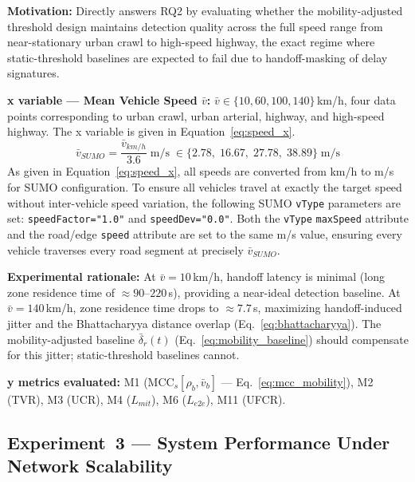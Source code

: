 \documentclass[12pt, a4paper]{report}
\begin{document}
{{\textbf{Motivation:} Directly answers RQ2 by
evaluating whether the mobility-adjusted threshold
design maintains detection quality across the full
speed range from near-stationary urban crawl to
high-speed highway, the exact regime where
static-threshold baselines are expected to fail
due to handoff-masking of delay signatures.

\textbf{x variable — Mean Vehicle Speed $\bar{v}$:}
$\bar{v} \in \{10, 60, 100, 140\}$\,km/h,
four data points corresponding to urban crawl,
urban arterial, highway, and high-speed highway.
The x variable is given in
Equation~\eqref{eq:speed_x}.
\begin{equation}
\bar{v}_{SUMO} = \frac{\bar{v}_{km/h}}{3.6}
\;\text{m/s} \;\in
\{2.78,\; 16.67,\; 27.78,\; 38.89\}\;\text{m/s}
\label{eq:speed_x}
\end{equation}
As given in Equation~\eqref{eq:speed_x}, all speeds
are converted from km/h to m/s for \ac{SUMO}
configuration. To ensure all vehicles travel at
exactly the target speed without inter-vehicle speed
variation, the following \ac{SUMO} \texttt{vType}
parameters are set: \texttt{speedFactor="1.0"} and
\texttt{speedDev="0.0"}. Both the \texttt{vType}
\texttt{maxSpeed} attribute and the road/edge
\texttt{speed} attribute are set to the same m/s
value, ensuring every vehicle traverses every road
segment at precisely $\bar{v}_{SUMO}$.

\textbf{Experimental rationale:} At $\bar{v} = 10$\,km/h,
handoff latency is minimal (long zone residence time
of $\approx 90$--$220$\,s), providing a near-ideal
detection baseline. At $\bar{v} = 140$\,km/h,
zone residence time drops to $\approx 7.7$\,s,
maximizing handoff-induced jitter and the
Bhattacharyya distance overlap
(Eq.~\ref{eq:bhattacharyya}). The mobility-adjusted
baseline $\bar{\delta}_r(t)$ (Eq.~\ref{eq:mobility_baseline})
should compensate for this jitter; static-threshold
baselines cannot.

\textbf{y metrics evaluated:}
M1 ($\text{MCC}_s[\rho_b, \bar{v}_b]$ —
Eq.~\ref{eq:mcc_mobility}), M2 (TVR), M3 (UCR),
M4 ($L_{mit}$), M6 ($L_{e2e}$), M11 (UFCR).



\subsection{Experiment~3 — System Performance Under
Network Scalability}
\label{sec:exp3}

}}
\end{document}
